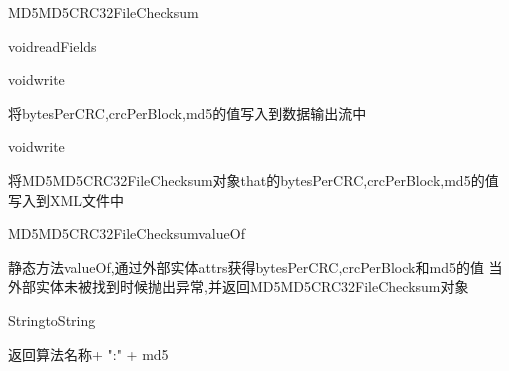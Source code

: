 \begin{XeClass}{MD5MD5CRC32FileChecksum}
\begin{XeMethod}{\XePublic}{void}{readFields}
    \end{XeMethod}

    \begin{XeMethod}{\XePublic}{void}{write}
         
 将bytesPerCRC,crcPerBlock,md5的值写入到数据输出流中

    \end{XeMethod}

    \begin{XeMethod}{\XePublic}{void}{write}
         
 将MD5MD5CRC32FileChecksum对象that的bytesPerCRC,crcPerBlock,md5的值写入到XML文件中

    \end{XeMethod}

    \begin{XeMethod}{\XePublic}{MD5MD5CRC32FileChecksum}{valueOf}
         
 静态方法valueOf,通过外部实体attrs获得bytesPerCRC,crcPerBlock和md5的值
 当外部实体未被找到时候抛出异常,并返回MD5MD5CRC32FileChecksum对象

    \end{XeMethod}

    \begin{XeMethod}{\XePublic}{String}{toString}
         
 返回算法名称+ ":" + md5

    \end{XeMethod}

\end{XeClass}
